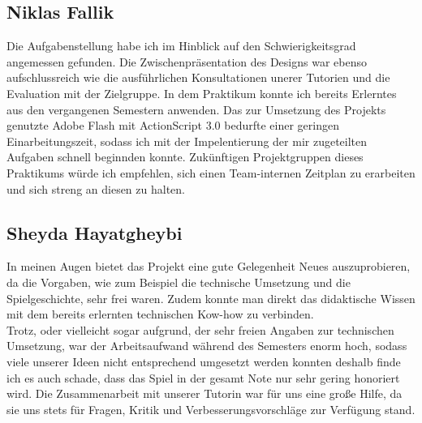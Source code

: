 \documentclass[a4paper, 11pt]{article} %
\begin{document}
\subsection{Niklas Fallik}
Die Aufgabenstellung habe ich im Hinblick auf den Schwierigkeitsgrad angemessen gefunden.
Die Zwischenpräsentation des Designs war ebenso aufschlussreich wie die ausführlichen Konsultationen unerer Tutorien und die Evaluation mit der Zielgruppe.
In dem Praktikum konnte ich bereits Erlerntes aus den vergangenen Semestern anwenden.
Das zur Umsetzung des Projekts genutzte Adobe Flash mit ActionScript 3.0 bedurfte einer geringen Einarbeitungszeit, sodass ich mit der Impelentierung der mir zugeteilten Aufgaben schnell beginnden konnte.
Zukünftigen Projektgruppen dieses Praktikums würde ich empfehlen, sich einen Team-internen Zeitplan zu erarbeiten und sich streng an diesen zu halten.

\subsection{Sheyda Hayatgheybi}
In meinen Augen bietet das Projekt eine gute Gelegenheit Neues auszuprobieren, da die Vorgaben, wie zum Beispiel die technische Umsetzung und die Spielgeschichte, sehr frei waren. Zudem konnte man direkt das didaktische Wissen mit dem bereits erlernten technischen Kow-how zu verbinden. \\
Trotz, oder vielleicht sogar aufgrund, der sehr freien Angaben zur technischen Umsetzung, war der Arbeitsaufwand während des Semesters enorm hoch, sodass viele unserer Ideen nicht entsprechend umgesetzt werden konnten deshalb finde ich es auch schade, dass das Spiel in der gesamt Note nur sehr gering honoriert wird. 
Die Zusammenarbeit mit unserer Tutorin war für uns eine große Hilfe, da sie uns stets für Fragen, Kritik und Verbesserungsvorschläge zur Verfügung stand.


\end{document}
